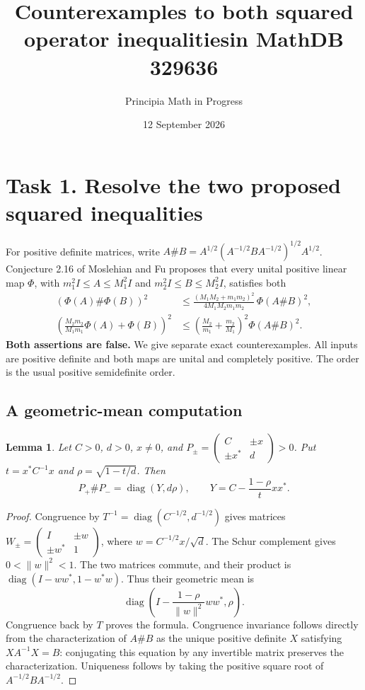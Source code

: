 \documentclass[11pt]{article}
\title{Counterexamples to both squared operator inequalities\newline in MathDB 329636}
\author{Principia Math in Progress}
\date{12 September 2026}
\newtheorem{lemma}{Lemma}
\begin{document}
\maketitle

\section*{Task 1. Resolve the two proposed squared inequalities}
For positive definite matrices, write
$A\#B=A^{1/2}(A^{-1/2}BA^{-1/2})^{1/2}A^{1/2}$.
Conjecture 2.16 of Moslehian and Fu \cite{MF} proposes that every unital
positive linear map $\Phi$, with
$m_1^2I\leq A\leq M_1^2I$ and $m_2^2I\leq B\leq M_2^2I$,
satisfies both
\begin{align}
 (\Phi(A)\#\Phi(B))^2&\leq
 \frac{(M_1M_2+m_1m_2)^2}{4M_1M_2m_1m_2}\,\Phi(A\#B)^2,
 \label{PS}\\
 \left(\frac{M_2m_2}{M_1m_1}\Phi(A)+\Phi(B)\right)^2
 &\leq\left(\frac{M_2}{m_1}+\frac{m_2}{M_1}\right)^2\Phi(A\#B)^2.
 \label{DM}
\end{align}
\textbf{Both assertions are false.} We give separate exact counterexamples.
All inputs are positive definite and both maps are unital and completely positive.
The order is the usual positive semidefinite order.

\subsection*{A geometric-mean computation}
\begin{lemma}
Let $C>0$, $d>0$, $x\neq0$, and
$P_\pm=\begin{pmatrix}C&\pm x\\\pm x^*&d\end{pmatrix}>0$.
Put $t=x^*C^{-1}x$ and $\rho=\sqrt{1-t/d}$. Then
\[
 P_+\#P_-=\operatorname{diag}(Y,d\rho),\qquad
 Y=C-\frac{1-\rho}{t}xx^*.
\]
\end{lemma}
\begin{proof}
Congruence by $T^{-1}=\operatorname{diag}(C^{-1/2},d^{-1/2})$
gives matrices $W_\pm=\begin{pmatrix}I&\pm w\\\pm w^*&1\end{pmatrix}$,
where $w=C^{-1/2}x/\sqrt d$. The Schur complement gives $0<\|w\|^2<1$.
The two matrices commute, and their product is
$\operatorname{diag}(I-ww^*,1-w^*w)$. Thus their geometric mean is
\[
 \operatorname{diag}\left(I-\frac{1-\rho}{\|w\|^2}ww^*,\rho\right).
\]
Congruence back by $T$ proves the formula. Congruence invariance follows
directly from the characterization of $A\#B$ as the unique positive definite
$X$ satisfying $XA^{-1}X=B$: conjugating this equation by any invertible
matrix preserves the characterization. Uniqueness follows by taking the
positive square root of $A^{-1/2}BA^{-1/2}$.
\end{proof}
\end{document}
